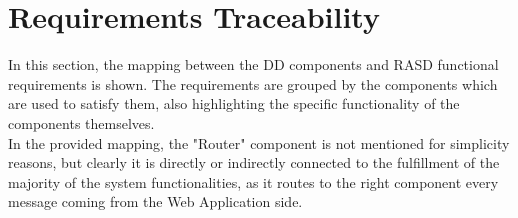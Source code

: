 \documentclass[../DD.tex]{subfiles}
\begin{document}
\chapter{Requirements Traceability}
\thispagestyle{fancy}

In this section, the mapping between the DD components and RASD functional requirements is shown. The requirements are grouped by the components which are used to satisfy them, also highlighting the specific functionality of the components themselves.\\

In the provided mapping, the "Router" component is not mentioned for simplicity reasons, but clearly it is directly or indirectly connected to the fulfillment of the majority of the system functionalities, as it routes to the right component every message coming from the Web Application side.
\end{document}
